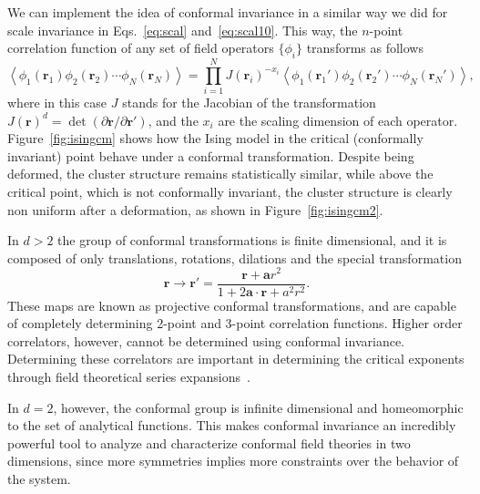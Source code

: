We can implement the idea of conformal invariance in a similar way we did
for scale invariance in Eqs.~\ref{eq:scal} and~\ref{eq:scal10}.
This way, the $n$-point correlation function of any set of field
operators $\{\phi_i\}$ transforms as follows
\begin{equation}
    \label{eq:cinv}
    \left\langle
        \phi_{1}\left(\mathbf{r}_{1}\right)
        \phi_{2}\left(\mathbf{r}_{2}\right)
        \cdots
        \phi_{N}\left(\mathbf{r}_{N}\right)
    \right\rangle =
    \prod_{i=1}^{N}J{\left(\mathbf{r}_{i}\right)}^{-x_{i}}
    \left\langle
        \phi_{1}\left(\mathbf{r}_{1}'\right)
        \phi_{2}\left(\mathbf{r}_{2}'\right)
        \cdots
        \phi_{N}\left(\mathbf{r}_{N}'\right)
    \right\rangle,
\end{equation}
where in this case $J$ stands for the Jacobian of the transformation
$J{\left(\mathbf{r}\right)}^{d}=
\det\left(\partial\mathbf{r}/\partial\mathbf{r}'\right)$, and the $x_i$ are the
scaling dimension of each operator. Figure~\ref{fig:isingcm} shows how the Ising
model in the critical (conformally invariant) point behave under a conformal
transformation. Despite being deformed, the cluster structure remains
statistically similar, while above the critical point, which is not conformally
invariant, the cluster structure is clearly non uniform after a deformation, as
shown in Figure~\ref{fig:isingcm2}.

In $d>2$ the group of conformal transformations is finite dimensional, and
it is composed of only translations, rotations, dilations and the special
transformation
\begin{equation}
    \mathbf{r}\rightarrow\mathbf{r}'=
    \frac{\mathbf{r}+\mathbf{a}r^{2}}{1+2\mathbf{a}\cdot\mathbf{r}+a^{2}r^{2}}.
\end{equation}
These maps are known as projective conformal transformations, and are capable
of completely determining 2-point and 3-point correlation functions. Higher
order correlators, however, cannot be determined using conformal invariance.
Determining these correlators are important in determining the critical
exponents through field theoretical series expansions~\cite{Henkel2013}.

In $d=2$, however, the conformal group is infinite dimensional and homeomorphic
to the set of analytical functions. This makes conformal invariance an
incredibly powerful tool to analyze and characterize conformal field theories
in two dimensions, since more symmetries implies more constraints over the
behavior of the system.

